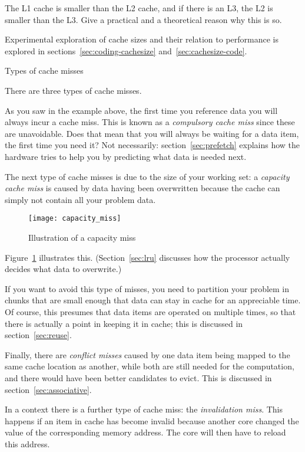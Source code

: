 \begin{exercise}
  The L1 cache is smaller than the L2 cache, and if there is an L3,
  the L2 is smaller than the L3. Give a practical and a theoretical
  reason why this is so.  
\end{exercise}

Experimental exploration of cache sizes and their relation to
performance is explored in sections~\ref{sec:coding-cachesize}
and~\ref{sec:cachesize-code}.

 {Types of cache misses}
\label{sec:cache-miss}

There are three types of cache misses.

As you saw in the example above, the first time you reference data you
will always incur a cache miss. This is known as a \emph{compulsory
cache miss} since these are unavoidable.
Does that mean that you will always be waiting for a data item, the first
time you need it? Not necessarily: section~\ref{sec:prefetch} explains
how the hardware tries to help you by predicting what data is needed next.

The next type of cache misses is due to the size of your working set:
a \emph{capacity cache miss} is caused by
data having been overwritten because the cache can simply not contain
all your problem data.
\begin{figure}[ht]
  \texttt{[image: capacity\_miss]}  
  \caption{Illustration of a capacity miss}
  \label{fig:capacity-miss}
\end{figure}
Figure~\ref{fig:capacity-miss} illustrates this.
(Section~\ref{sec:lru} discusses how the processor actually
decides what data to overwrite.)

If you want to avoid this type of misses, you
need to partition your problem in chunks that are small enough that
data can stay in cache for an appreciable time. Of course, this
presumes that data items are operated on multiple times, so that there
is actually a point in keeping it in cache; this is discussed in
section~\ref{sec:reuse}.

Finally, there are \emph{conflict misses}
caused by one data item being mapped to the same cache location
as another, while both are still needed for the computation, and
there would have been better candidates to evict. This is discussed
in section~\ref{sec:associative}.

In a  context there is a further type of cache miss:
the \emph{invalidation miss}. This happens
if an item in cache has become invalid because another core
changed the value of the corresponding memory address. The core will then
have to reload this address.

